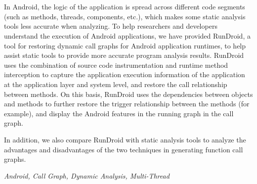 \newpage
{}
\vspace{-5.5cm}
\chapter*{}
\vspace{-0.5cm}

In Android, the logic of the application is spread across different code segments (such as methods, threads, components, etc.), which makes some static analysis tools less accurate when analyzing.
To help researchers and developers understand the execution of Android applications, we have provided RunDroid, a tool for restoring dynamic call graphs for Android application runtimes, to help assist static tools to provide more accurate program analysis results.
RunDroid uses the combination of source code instrumentation and runtime method interception to capture the application execution information of the application at the application layer and system level, and restore the call relationship between methods.
On this basis, RunDroid uses the dependencies between objects and methods to further restore the trigger relationship between the methods (for example), and display the Android features in the running graph in the call graph.

In addition, we also compare RunDroid with static analysis tools to analyze the advantages and disadvantages of the two techniques in generating function call graphs.



{} \textit{Android, Call Graph, Dynamic Analysis, Multi-Thread}


































